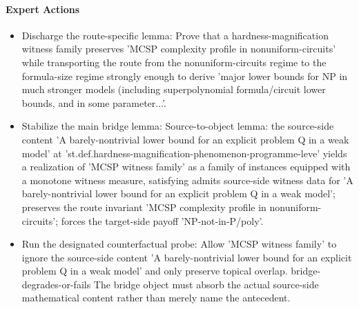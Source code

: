 \documentclass[11pt]{article}
\begin{document}
\paragraph{Expert Actions}
\begin{itemize}[leftmargin=*,itemsep=0.2em]
\item Discharge the route-specific lemma: Prove that a hardness-magnification witness family preserves 'MCSP complexity profile in nonuniform-circuits' while transporting the route from the nonuniform-circuits regime to the formula-size regime strongly enough to derive 'major lower bounds for NP in much stronger models (including superpolynomial formula/circuit lower bounds, and in some parameter...'.
\item Stabilize the main bridge lemma: Source-to-object lemma: the source-side content 'A barely-nontrivial lower bound for an explicit problem Q in a weak model' at 'st.def.hardness-magnification-phenomenon-programme-leve' yields a realization of 'MCSP witness family' as a family of instances equipped with a monotone witness measure, satisfying admits source-side witness data for 'A barely-nontrivial lower bound for an explicit problem Q in a weak model'; preserves the route invariant 'MCSP complexity profile in nonuniform-circuits'; forces the target-side payoff 'NP-not-in-P/poly'.
\item Run the designated counterfactual probe: Allow 'MCSP witness family' to ignore the source-side content 'A barely-nontrivial lower bound for an explicit problem Q in a weak model' and only preserve topical overlap. bridge-degrades-or-fails The bridge object must absorb the actual source-side mathematical content rather than merely name the antecedent.
\end{itemize}
\end{document}
